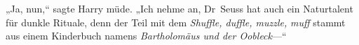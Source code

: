„Ja, nun,“ sagte Harry müde. „Ich nehme an, Dr~Seuss hat auch ein Naturtalent für dunkle Rituale, denn der Teil mit dem \emph{Shuffle, duffle, muzzle,} \emph{muff} stammt aus einem Kinderbuch namens \emph{Bartholomäus und der Oobleck}—“


